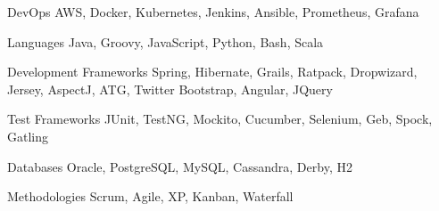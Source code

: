 
\begin{cvskills}

  \cvskill
    {DevOps} %
    {AWS, Docker, Kubernetes, Jenkins, Ansible, Prometheus, Grafana} %

  \cvskill
    {Languages} %
    {Java, Groovy, JavaScript, Python, Bash, Scala} %
    
  \cvskill
    {Development Frameworks} %
    {Spring, Hibernate, Grails, Ratpack, Dropwizard, Jersey, AspectJ, ATG, Twitter Bootstrap, Angular, JQuery} %
    
  \cvskill
    {Test Frameworks} %
    {JUnit, TestNG, Mockito, Cucumber, Selenium, Geb, Spock, Gatling} %

  \cvskill
    {Databases} %
    {Oracle, PostgreSQL, MySQL, Cassandra, Derby, H2} %
    
  \cvskill
    {Methodologies} %
    {Scrum, Agile, XP, Kanban, Waterfall} %

\end{cvskills}
